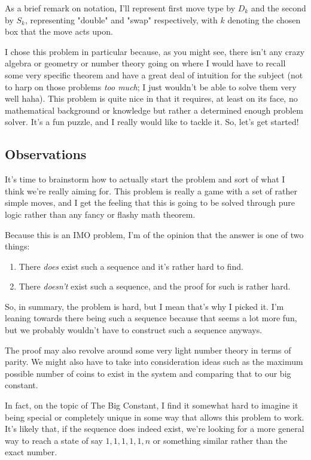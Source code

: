 As a brief remark on notation, I'll represent first move type by \( D_k \) and the second by \( S_k \), representing "double" and "swap" respectively, with \( k \) denoting the chosen box that the move acts upon.

I chose this problem in particular because, as you might see, there isn't any
crazy algebra or geometry or number theory going on where I would have to
recall some very specific theorem and have a great deal of intuition for the
subject (not to harp on those problems \textit{too much}; I just wouldn't be
able to solve them very well haha). This problem is quite nice in that it
requires, at least on its face, no mathematical background or knowledge but
rather a determined enough problem solver. It's a fun puzzle, and I really would
like to tackle it. So, let's get started!

\subsection{Observations}

It's time to brainstorm how to actually start the problem and sort of what I
think we're really aiming for.  This problem is really a game with a set of rather simple moves, and
I get the feeling that this is going to be solved through pure logic rather
than any fancy or flashy math theorem. 

Because this is an IMO problem, I'm of the opinion that the answer is one of
two things:
\begin{enumerate}
    \item There \textit{does} exist such a sequence and it's rather hard to
        find.
    \item There \textit{doesn't} exist such a sequence, and the proof for such
        is rather hard.
\end{enumerate}
So, in summary, the problem is hard, but I mean that's why I picked it. I'm
leaning towards there being such a sequence because that seems a lot more fun,
but we probably wouldn't have to construct such a sequence anyways.

The proof may also revolve around some very light number theory in terms of
parity. We might also have to take into consideration ideas such as the maximum
possible number of coins to exist in the system and comparing that to our big
constant.

In fact, on the topic of The Big Constant\texttrademark, I find it somewhat
hard to imagine it being special or completely unique in some way that allows
this problem to work.  It's likely that, if the sequence does indeed exist, we're looking
for a more general way to reach a state of say \( 1, 1, 1, 1, 1, n \) or
something similar rather than the exact number.

